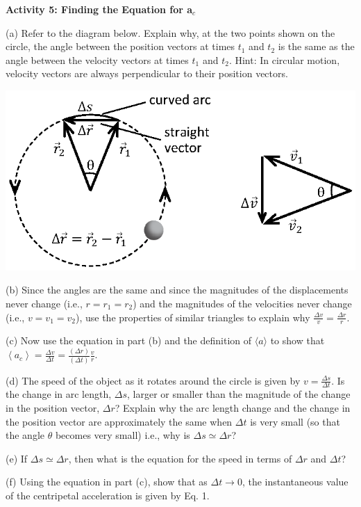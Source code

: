 \pagebreak[3]
\textbf{Activity 5: Finding the Equation for a\( _{c} \) }

(a) Refer to the diagram below. Explain why, at the two points shown on the
circle, the angle between the position vectors at times \( t_{1} \) and \( t_{2} \)
is the same as the angle between the velocity vectors at times \( t_{1} \)
and \( t_{2} \). Hint: In circular motion, velocity vectors are always perpendicular
to their position vectors.

\vspace{0.3cm}
{\par\raggedright \includegraphics{circ_motion/circ_motion_fig3_new.eps} \par}
\vspace{0.3cm}

(b) Since the angles are the same and since the magnitudes of the displacements
never change (i.e., $r= r_{1}  = r_{2} $) and the magnitudes of the
velocities never change (i.e., $v = v_{1} = v_{2} $), use the properties
of similar triangles to explain why \( \frac{\Delta v}{v}=\frac{\Delta r}{r} \).
\vspace{20mm}

(c) Now use the equation in part (b) and the definition of $\langle
a\rangle$ to show that
\( \left\langle a_{c}\right\rangle =\frac{\Delta v}{\Delta t}=\frac{\left( \Delta r\right) }{\left( \Delta t\right) }\frac{v}{r}. \)
\vspace{20mm}

(d) The speed of the object as it rotates around the circle is given by \( v=\frac{\Delta s}{\Delta t} \).
Is the change in arc length, \( \Delta  s\), larger or smaller than the magnitude
of the change in the position vector, \( \Delta  r\)? Explain why the arc length
change and the change in the position vector are approximately the same when
$\Delta t$ is very small (so that the angle $\theta$ 
becomes very small) i.e., why is \( \Delta  s
\simeq  \Delta  r\)?
\vspace{20mm}

(e) If \( \Delta  s  \simeq   \Delta  r\), then what is the equation
for the speed in terms of \( \Delta  r\) and \( \Delta  t\)?
\vspace{20mm}

(f) Using the equation in part (c), show that as \( \Delta  t\rightarrow 0 \), 
the instantaneous value of the centripetal acceleration is given by Eq. 1.

